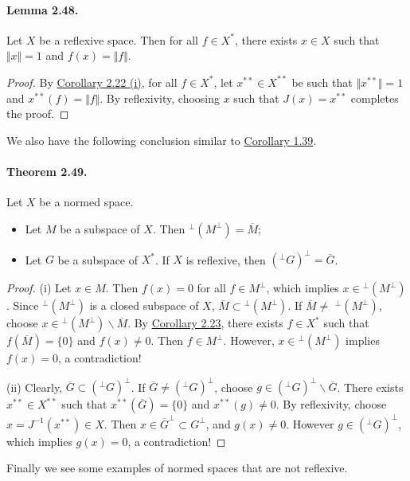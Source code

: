 \documentclass{article}
\begin{document}
\paragraph{Lemma 2.48.\label{lemma:2.48}} Let $X$ be a reflexive space. Then for all $f\in X^*$, there exists $x\in X$ such that $\Vert x\Vert = 1$ and $f(x)=\Vert f\Vert$.
\begin{proof}
By \hyperref[cor:2.22]{Corollary 2.22 (i)}, for all $f\in X^*$, let $x^{**}\in X^{**}$ be such that $\Vert x^{**}\Vert = 1$ and $x^{**}(f) = \Vert f\Vert$. By reflexivity, choosing $x$ such that $J(x)=x^{**}$ completes the proof.
\end{proof}

We also have the following conclusion similar to \hyperref[cor:1.39]{Corollary 1.39}.
\paragraph{Theorem 2.49.\label{thm:2.49}} Let $X$ be a normed space.
\begin{itemize}
	\item[(i)] Let $M$ be a subspace of $X$. Then $^\perp(M^\perp)=\overline{M}$;
	\item[(ii)] Let $G$ be a subspace of $X^*$. If $X$ is reflexive, then $(^\perp G)^\perp = \overline{G}$.
\end{itemize}
\begin{proof}
(i) Let $x\in M$. Then $f(x)=0$ for all $f\in M^\perp$, which implies $x\in$$^\perp(M^\perp)$. Since $^\perp(M^\perp)$ is a closed subspace of $X$, $\overline{M}\subset$$^\perp(M^\perp)$. If $\overline{M}\neq$ $^\perp(M^\perp)$, choose $x\in$$^\perp(M^\perp)\backslash\overline{M}$. By \hyperref[cor:2.23]{Corollary 2.23}, there exists $f\in X^*$ such that $f(\overline{M}) = \{0\}$ and $f(x)\neq 0$. Then $f\in M^\perp$. However, $x\in$$^\perp(M^\perp)$ implies $f(x)=0$, a contradiction!
\vspace{0.1cm}

(ii) Clearly, $\overline{G}\subset(^\perp G)^\perp$. If $\overline{G}\neq(^\perp G)^\perp$, choose $g\in(^\perp G)^\perp\backslash\overline{G}$. There exists $x^{**}\in X^{**}$ such that $x^{**}\left(\overline{G}\right)=\{0\}$ and $x^{**}(g)\neq 0$. By reflexivity, choose $x=J^{-1}(x^{**})\in X$. Then $x\in\overline{G}^\perp\subset G^\perp$, and $g(x)\neq 0$. However $g\in(^\perp G)^\perp$, which implies $g(x)=0$, a contradiction!
\end{proof}

Finally we see some examples of normed spaces that are not reflexive. 
\end{document}

